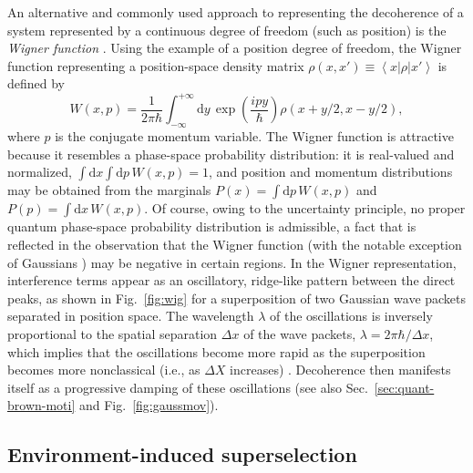 \documentclass[3p,sort&compress]{elsarticle}
\newcommand{\bra}[1]{\left\langle{#1}\right\vert}
\newcommand{\ket}[1]{\left\vert{#1}\right\rangle}
\newcommand{\D}{\ensuremath{\mathrm{d}}}
\newcommand{\I}{\ensuremath{i}}
\newcommand{\op}[1]{#1}
\begin{document}
An alternative and commonly used approach to representing the decoherence of a system represented by a continuous degree of freedom (such as position) is the \emph{Wigner function} \cite{Wigner:1932:un,Hillery:1984:tv}. Using the example of a position degree of freedom, the Wigner function representing a position-space density matrix $\rho(x,x') \equiv \bra{x}\op{\rho}\ket{x'}$ is defined by 
%
\begin{equation}
  \label{eq:fsoifhwddfs6611a}
W(x,p) = \frac{1}{2\pi\hbar} \int_{-\infty}^{+\infty} \D y \, \exp\left( \frac{\I p
  y}{\hbar}\right) \rho(x+y/2,x-y/2),
\end{equation}
%
where $p$ is the conjugate momentum variable. The Wigner function is attractive because it resembles a phase-space probability distribution: it is real-valued and normalized, $\int \D x \int \D p \,W(x,p) = 1$, and position and momentum distributions may be obtained from the marginals $P(x) = \int \D p \, W(x,p) $ and $P(p) = \int \D x \, W(x,p)$. Of course, owing to the uncertainty principle, no proper quantum phase-space probability distribution is admissible, a fact that is reflected in the observation that the Wigner function (with the notable exception of Gaussians \cite{Hudson:1974:ra}) may be negative in certain regions. In the Wigner representation, interference terms appear as an oscillatory, ridge-like pattern between the direct peaks, as shown in Fig.~\ref{fig:wig} for a superposition of two Gaussian wave packets separated in position space. The wavelength $\lambda$ of the oscillations is inversely proportional to the spatial separation $\Delta x$ of the wave packets, $\lambda =2\pi\hbar/\Delta x$, which implies that the oscillations become more rapid as the superposition becomes more nonclassical (i.e., as $\Delta X$ increases) \cite{Zurek:2002:ii,Schlosshauer:2007:un}. Decoherence then manifests itself as a progressive damping of these oscillations (see also Sec.~\ref{sec:quant-brown-moti} and Fig.~\ref{fig:gaussmov}). 

\subsection{\label{sec:envir-induc-supers}Environment-induced superselection}
\end{document}
